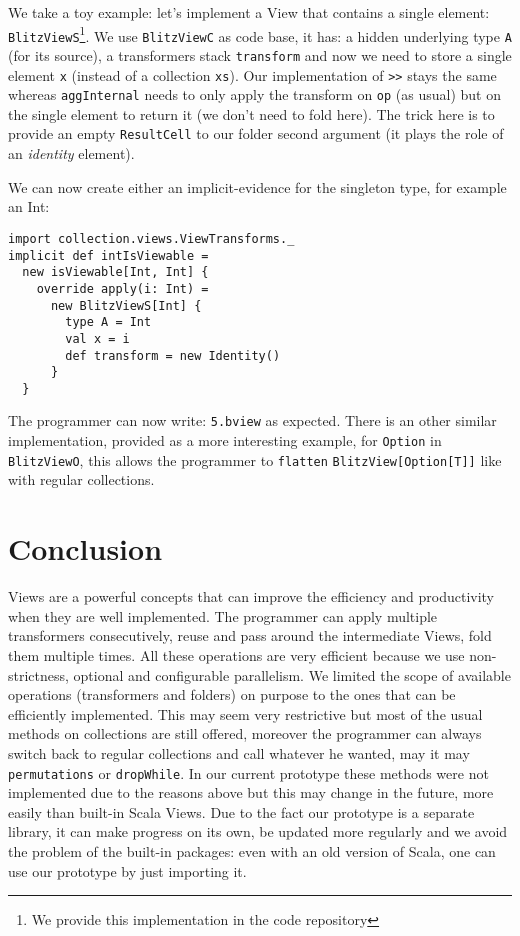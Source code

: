 \documentclass[a4paper,12pt,twocolumn]{article}
\begin{document}
We take a toy example: let's implement a View that contains a single element: \verb|BlitzViewS|\footnote{We provide this implementation in the code repository}.
We use \verb|BlitzViewC| as code base, it has: a hidden underlying type \verb|A| (for its source), a transformers stack \verb|transform| and now we need to store a single element \verb|x| (instead of a collection \verb|xs|).
Our implementation of \verb|>>| stays the same whereas \verb|aggInternal| needs to only apply the transform on \verb|op| (as usual) but on the single element to return it (we don't need to fold here).
The trick here is to provide an empty \verb|ResultCell| to our folder second argument (it plays the role of an {\it identity} element).

We can now create either an implicit-evidence for the singleton type, for example an Int:
\begin{lstlisting}
import collection.views.ViewTransforms._
implicit def intIsViewable =
  new isViewable[Int, Int] {
    override apply(i: Int) =
      new BlitzViewS[Int] {
        type A = Int
        val x = i
        def transform = new Identity()
      }
  }
\end{lstlisting}
The programmer can now write: \verb|5.bview| as expected.
There is an other similar implementation, provided as a more interesting example, for \verb|Option| in \verb|BlitzViewO|, this allows the programmer to \verb|flatten| \verb|BlitzView[Option[T]]| like with regular collections.

\section{Conclusion}
Views are a powerful concepts that can improve the efficiency and productivity when they are well implemented.
The programmer can apply multiple transformers consecutively, reuse and pass around the intermediate Views, fold them multiple times.
All these operations are very efficient because we use non-strictness, optional and configurable parallelism.
We limited the scope of available operations (transformers and folders) on purpose to the ones that can be efficiently implemented.
This may seem very restrictive but most of the usual methods on collections are still offered, moreover the programmer can always switch back to regular collections and call whatever he wanted, may it may \verb|permutations| or \verb|dropWhile|.
In our current prototype these methods were not implemented due to the reasons above but this may change in the future, more easily than built-in Scala Views.
Due to the fact our prototype is a separate library, it can make progress on its own, be updated more regularly and we avoid the problem of the built-in packages: even with an old version of Scala, one can use our prototype by just importing it.
\end{document}
